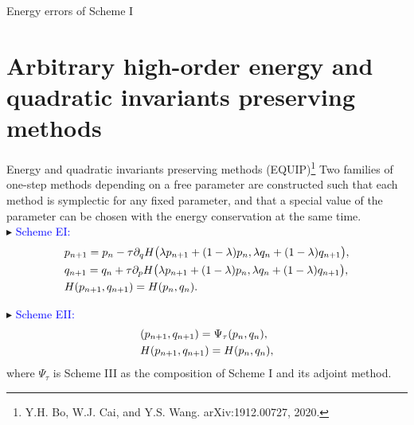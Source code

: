\documentclass[10pt]{beamer}
\begin{document}
\begin{frame}{Energy errors of Scheme I}	
\begin{figure}
\centering
{}\hspace{-2mm}
\end{figure}
\end{frame}	


\section{Arbitrary high-order energy and quadratic invariants preserving methods}
\begin{frame}{Energy and quadratic invariants preserving methods (EQUIP)\footnote{Y.H. Bo, W.J. Cai, and Y.S. Wang. arXiv:1912.00727, 2020.}}
Two families of one-step methods depending on a free parameter are constructed such that each method is symplectic for any fixed parameter, and that a special value of the parameter can be chosen with the energy conservation at the same time.\\
\vspace{2mm}
\textcolor[rgb]{0,0,1}{$\blacktriangleright$} \textcolor{blue}{Scheme EI:}
\begin{align}\label{eq-22}
\aligned
&p_{n+1}=p_n-\tau\partial_qH\big(\lambda p_{n+1}+(1-\lambda)p_n,\lambda q_n+(1-\lambda)q_{n+1}\big),\\
&q_{n+1}=q_n+\tau\partial_pH\big(\lambda p_{n+1}+(1-\lambda)p_n,\lambda q_n+(1-\lambda)q_{n+1}\big),\\
&H(p_{n+1},q_{n+1})=H(p_n,q_n).
\endaligned
\end{align}

\textcolor[rgb]{0,0,1}{$\blacktriangleright$} \textcolor{blue}{Scheme EII:}
\begin{align}\label{eq-23}
\aligned
&(p_{n+1},q_{n+1})=\Psi_\tau(p_n,q_n),\\
&H(p_{n+1},q_{n+1})=H(p_n,q_n),
\endaligned
\end{align}
where $\Psi_\tau$ is Scheme III as the composition of Scheme I and its adjoint method.
\end{frame}
\end{document}
